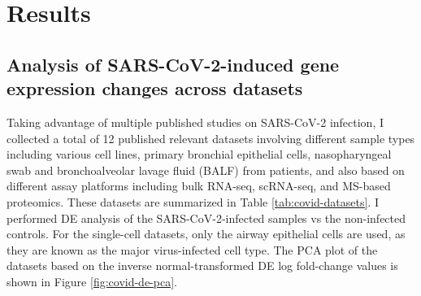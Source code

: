\documentclass[12pt,twoside,openany,\mydriver]{thesis}  %
\begin{document}
\hypertarget{results-2}{%
\section{Results}\label{results-2}}

\hypertarget{analysis-of-sars-cov-2-induced-gene-expression-changes-across-datasets}{%
\subsection{Analysis of SARS-CoV-2-induced gene expression changes across datasets}\label{analysis-of-sars-cov-2-induced-gene-expression-changes-across-datasets}}

Taking advantage of multiple published studies on SARS-CoV-2 infection, I collected a total of 12 published relevant datasets involving different sample types including various cell lines, primary bronchial epithelial cells, nasopharyngeal swab and bronchoalveolar lavage fluid (BALF) from patients, and also based on different assay platforms including bulk RNA-seq, scRNA-seq, and MS-based proteomics. These datasets are summarized in Table \ref{tab:covid-datasets}. I performed DE analysis of the SARS-CoV-2-infected samples vs the non-infected controls. For the single-cell datasets, only the airway epithelial cells are used, as they are known as the major virus-infected cell type. The PCA plot of the datasets based on the inverse normal-transformed DE log fold-change values is shown in Figure \ref{fig:covid-de-pca}.
\end{document}
